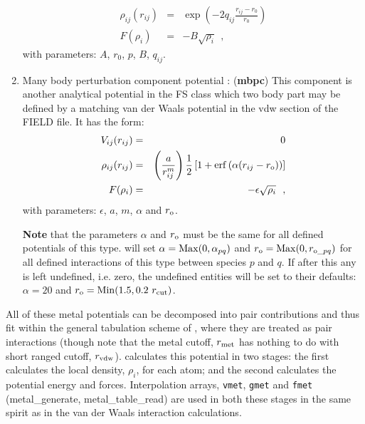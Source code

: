 \begin{enumerate}
\begin{eqnarray}
\rho_{ij}(r_{ij}) &=& \exp \left(-2 q_{ij} \frac{r_{ij}-r_{0}}{r_{0}}\right) \\
F(\rho_{i}) &=& -B \sqrt{\rho_{i}}~~, \nonumber
\end{eqnarray}
with parameters: $A$, $r_{0}$, $p$, $B$, $q_{ij}$.
\item Many body perturbation component potential \cite{cooper-14a}:  ({\bf mbpc})
This component is another analytical potential in the FS class which
two body part may be defined by a matching van der Waals potential in
the vdw section of the FIELD file.  It has the form:
\begin{eqnarray}
V_{ij}(r_{ij}) &=& 0 \nonumber \\
\rho_{ij}(r_{ij}) &=& \left(\frac{a}{r_{ij}^{m}}\right) \frac{1}{2}\left[1+{\rm erf}\left(\alpha(r_{ij}-r_{\rm o})\right)\right] \\
F(\rho_{i}) &=& -\epsilon \sqrt{\rho_{i}}~~, \nonumber
\end{eqnarray}
with parameters: $\epsilon$, $a$, $m$, $\alpha$ and $r_{\rm o}$.

{\bf Note} that the parameters $\alpha$ and $r_{\rm o}$ must be the same for all
defined potentials of this type.  \D will set $\alpha={\rm Max}(0,\alpha_{pq})$
and $r_{\rm o}={\rm Max}(0,r_{{\rm o}\_pq})$ for all defined interactions of
this type between species $p$ and $q$.  If after this any is left undefined,
i.e. zero, the undefined entities will be set to their defaults: $\alpha=20$
and $r_{\rm o}={\rm Min}(1.5,0.2~r_{\rm cut})$.
\end{enumerate}

All of these metal potentials can be decomposed into pair
contributions and thus fit within the general tabulation scheme of \D,
where they are treated as pair interactions (though note that the
metal cutoff, $r_{\rm met}$ has nothing to do with short ranged cutoff,
$r_{\rm vdw}$).  \D calculates this potential in two stages: the first
calculates the local density, $\rho_{i}$, for each atom; and the
second calculates the potential energy and forces.  Interpolation
arrays, {\tt vmet}, {\tt gmet} and {\tt fmet} ({\sc metal\_generate},
{\sc metal\_table\_read}) are used in both these stages in the same
spirit as in the van der Waals interaction calculations.

